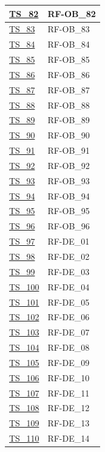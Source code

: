\begin{longtable}{|
		>{\raggedright\arraybackslash}p{} |
		>{\centering\arraybackslash}p{} |
	}
	\hyperlink{ts-82}{TS\_82} & RF-OB\_82 \\ \hline
	\hyperlink{ts-83}{TS\_83} & RF-OB\_83 \\ \hline
	\hyperlink{ts-84}{TS\_84} & RF-OB\_84 \\ \hline
	\hyperlink{ts-85}{TS\_85} & RF-OB\_85 \\ \hline
	\hyperlink{ts-86}{TS\_86} & RF-OB\_86 \\ \hline
	\hyperlink{ts-87}{TS\_87} & RF-OB\_87 \\ \hline
	\hyperlink{ts-88}{TS\_88} & RF-OB\_88 \\ \hline
	\hyperlink{ts-89}{TS\_89} & RF-OB\_89 \\ \hline
	\hyperlink{ts-90}{TS\_90} & RF-OB\_90 \\ \hline
	\hyperlink{ts-91}{TS\_91} & RF-OB\_91 \\ \hline
	\hyperlink{ts-92}{TS\_92} & RF-OB\_92 \\ \hline
	\hyperlink{ts-93}{TS\_93} & RF-OB\_93 \\ \hline
	\hyperlink{ts-94}{TS\_94} & RF-OB\_94 \\ \hline
	\hyperlink{ts-95}{TS\_95} & RF-OB\_95 \\ \hline
	\hyperlink{ts-96}{TS\_96} & RF-OB\_96 \\ \hline
	\hyperlink{ts-97}{TS\_97} & RF-DE\_01 \\ \hline
	\hyperlink{ts-98}{TS\_98} & RF-DE\_02 \\ \hline
	\hyperlink{ts-99}{TS\_99} & RF-DE\_03 \\ \hline
	\hyperlink{ts-100}{TS\_100} & RF-DE\_04 \\ \hline
	\hyperlink{ts-101}{TS\_101} & RF-DE\_05 \\ \hline
	\hyperlink{ts-102}{TS\_102} & RF-DE\_06 \\ \hline
	\hyperlink{ts-103}{TS\_103} & RF-DE\_07 \\ \hline
	\hyperlink{ts-104}{TS\_104} & RF-DE\_08 \\ \hline
	\hyperlink{ts-105}{TS\_105} & RF-DE\_09 \\ \hline
	\hyperlink{ts-106}{TS\_106} & RF-DE\_10 \\ \hline
	\hyperlink{ts-107}{TS\_107} & RF-DE\_11 \\ \hline
	\hyperlink{ts-108}{TS\_108} & RF-DE\_12 \\ \hline
	\hyperlink{ts-109}{TS\_109} & RF-DE\_13 \\ \hline
	\hyperlink{ts-110}{TS\_110} & RF-DE\_14 \\ \hline

\end{longtable}
